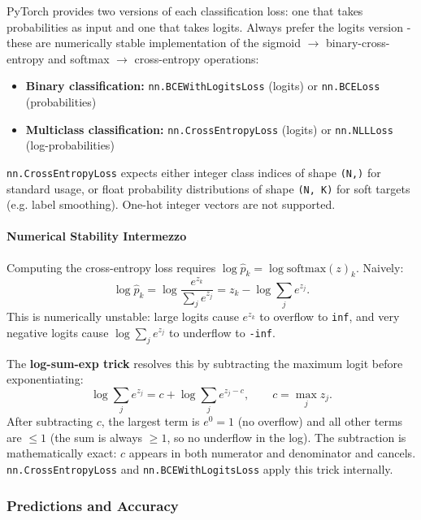 PyTorch provides two versions of each classification loss: one that takes probabilities as input and one that takes logits. Always prefer the logits version - these are numerically stable implementation of the sigmoid $\to$ binary-cross-entropy and softmax $\to$ cross-entropy operations:

\begin{itemize}
    \item \textbf{Binary classification:} \texttt{nn.BCEWithLogitsLoss} (logits) or \texttt{nn.BCELoss} (probabilities)
    \item \textbf{Multiclass classification:} \texttt{nn.CrossEntropyLoss} (logits) or \texttt{nn.NLLLoss} (log-probabilities)
\end{itemize}

\texttt{nn.CrossEntropyLoss} expects either integer class indices of shape \texttt{(N,)} for standard usage, or float probability distributions of shape \texttt{(N, K)} for soft targets (e.g. label smoothing). One-hot integer vectors are not supported.

\paragraph{Numerical Stability Intermezzo} 
Computing the cross-entropy loss requires $\log \hat{p}_k = \log \text{softmax}(z)_k$. Naively:
\begin{equation}
    \log \hat{p}_k = \log \frac{e^{z_k}}{\sum_j e^{z_j}} = z_k - \log \sum_j e^{z_j}.
\end{equation}
This is numerically unstable: large logits cause $e^{z_k}$ to overflow to \texttt{inf}, and very negative logits cause $\log \sum_j e^{z_j}$ to underflow to \texttt{-inf}.

The \textbf{log-sum-exp trick} resolves this by subtracting the maximum logit before exponentiating:
\begin{equation}
    \log \sum_j e^{z_j} = c + \log \sum_j e^{z_j - c}, \qquad c = \max_j z_j.
\end{equation}
After subtracting $c$, the largest term is $e^0 = 1$ (no overflow) and all other terms are $\leq 1$ (the sum is always $\geq 1$, so no underflow in the log). The subtraction is mathematically exact: $c$ appears in both numerator and denominator and cancels. \texttt{nn.CrossEntropyLoss} and \texttt{nn.BCEWithLogitsLoss} apply this trick internally.

\subsubsection{Predictions and Accuracy}

